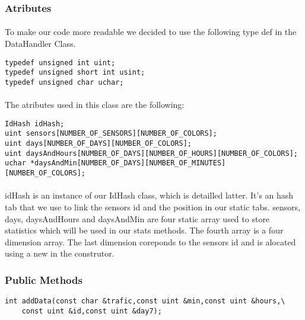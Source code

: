 \documentclass[a4paper, 12pts]{article}
\begin{document}
\subsubsection{Atributes}
\paragraph{}
	To make our code more readable we decided to use the following type def in the DataHandler Class.
\begin{lstlisting}
typedef unsigned int uint;
typedef unsigned short int usint;
typedef unsigned char uchar;
\end{lstlisting}

\paragraph{}
	The atributes used in this class are the following:
\begin{lstlisting}
IdHash idHash;
uint sensors[NUMBER_OF_SENSORS][NUMBER_OF_COLORS];
uint days[NUMBER_OF_DAYS][NUMBER_OF_COLORS];
uint daysAndHours[NUMBER_OF_DAYS][NUMBER_OF_HOURS][NUMBER_OF_COLORS];
uchar *daysAndMin[NUMBER_OF_DAYS][NUMBER_OF_MINUTES][NUMBER_OF_COLORS];
\end{lstlisting}

\paragraph{}
	idHash is an instance of our IdHash class, which is detailled latter. It's an hash tab that we use to link the sensors id and the position in our static tabs.
	sensors, days, daysAndHours and daysAndMin are four static array used to store statistics which will be used in our stats methods. The fourth array is a four dimension array. The last dimension coreponds to the sensors id and is alocated using a new in the construtor.

\subsubsection{Public Methods}

\begin{lstlisting}
int addData(const char &trafic,const uint &min,const uint &hours,\
	const uint &id,const uint &day7);
\end{lstlisting}
\end{document}
